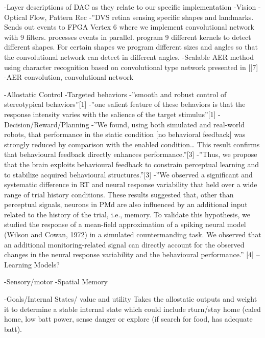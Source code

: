 -Layer descriptions of DAC as they relate to our specific implementation
-Vision -Optical Flow, Pattern Rec -\textquotedblright{}DVS retina
sensing specific shapes and landmarks. Sends out events to FPGA Vertex
6 where we implement convolutional network with 9 filters. processes
events in parallel. program 9 different kernels to detect different
shapes. For certain shapes we program different sizes and angles so
that the convolutional network can detect in different angles. -Scalable
AER method using character recognition based on convolutional type
network presented in {[}{[}7{]} -AER convolution, convolutional network

-Allostatic Control -Targeted behaviors -\textquotedblright{}smooth
and robust control of stereotypical behaviors\textquotedblright{}{[}1{]}
-\textquotedblright{}one salient feature of these behaviors is that
the response intensity varies with the salience of the target stimulus\textquotedblright{}{[}1{]}
-Decision/Reward/Planning -\textquotedblright{}We found, using both
simulated and real-world robots, that performance in the static condition
{[}no behavioral feedback{]} was strongly reduced by comparison with
the enabled condition\ldots{} This result confirms that behavioural
feedback directly enhances performance.\textquotedblright{}{[}3{]}
-\textquotedblright{}Thus, we propose that the brain exploits behavioural
feedback to constrain perceptual learning and to stabilize acquired
behavioural structures.\textquotedblright{}{[}3{]} -\textquotedblright{}We
observed a signifi{}cant and systematic difference in RT and neural
response variability that held over a wide range of trial history
conditions. These results suggested that, other than perceptual signals,
neurons in PMd are also infl{}uenced by an additional input related
to the history of the trial, i.e., memory. To validate this hypothesis,
we studied the response of a mean-fi{}eld approximation of a spiking
neural model (Wilson and Cowan, 1972) in a simulated countermanding
task. We observed that an additional monitoring-related signal can
directly account for the observed changes in the neural response variability
and the behavioural performance.\textquotedblright{} {[}4{]} --Learning
Models?

-Sensory/motor -Spatial Memory

-Goals/Internal States/ value and utility Takes the allostatic outputs
and weight it to determine a stable internal state which could include
rturn/stay home (caled home, low batt power, sense danger or explore
(if search for food, has adequate batt).

